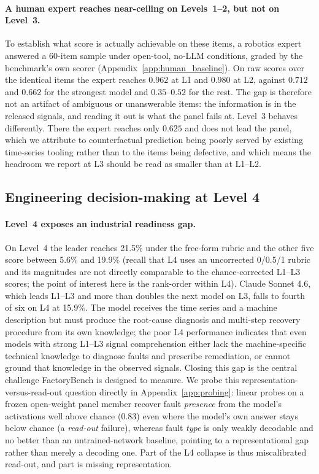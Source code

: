 \paragraph{A human expert reaches near-ceiling on Levels~1--2, but not on Level~3.}
To establish what score is actually achievable on these items, a robotics expert answered a $60$-item sample under open-tool, no-LLM conditions, graded by the benchmark's own scorer (Appendix~\ref{app:human_baseline}). On raw scores over the identical items the expert reaches $0.962$ at L1 and $0.980$ at L2, against $0.712$ and $0.662$ for the strongest model and $0.35$--$0.52$ for the rest. The gap is therefore not an artifact of ambiguous or unanswerable items: the information is in the released signals, and reading it out is what the panel fails at. Level~3 behaves differently. There the expert reaches only $0.625$ and does not lead the panel, which we attribute to counterfactual prediction being poorly served by existing time-series tooling rather than to the items being defective, and which means the headroom we report at L3 should be read as smaller than at L1--L2.

\subsection{Engineering decision-making at Level 4}
\label{subsec:l4}

\paragraph{Level~4 exposes an industrial readiness gap.}
On Level~4 the leader reaches 21.5\% under the free-form rubric and the other five score between 5.6\% and 19.9\% (recall that L4 uses an uncorrected 0/0.5/1 rubric and its magnitudes are not directly comparable to the chance-corrected L1--L3 scores; the point of interest here is the rank-order within L4). Claude Sonnet 4.6, which leads L1--L3 and more than doubles the next model on L3, falls to fourth of six on L4 at 15.9\%. The model receives the time series and a machine description but must produce the root-cause diagnosis and multi-step recovery procedure from its own knowledge; the poor L4 performance indicates that even models with strong L1--L3 signal comprehension either lack the machine-specific technical knowledge to diagnose faults and prescribe remediation, or cannot ground that knowledge in the observed signals. Closing this gap is the central challenge FactoryBench is designed to measure. We probe this representation-versus-read-out question directly in Appendix~\ref{app:probing}: linear probes on a frozen open-weight panel member recover fault \emph{presence} from the model's activations well above chance ($0.83$) even where the model's own answer stays below chance (a \emph{read-out} failure), whereas fault \emph{type} is only weakly decodable and no better than an untrained-network baseline, pointing to a representational gap rather than merely a decoding one. Part of the L4 collapse is thus miscalibrated read-out, and part is missing representation.

